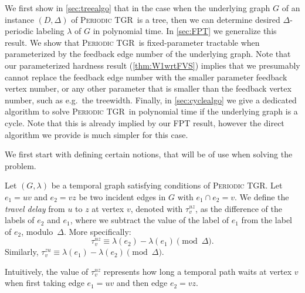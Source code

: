 \documentclass[a4paper,UKenglish,cleveref, autoref, thm-restate, anonymous]{lipics-v2021}
\newcommand{\deltaExact}{\textsc{Periodic TGR}}
\begin{document}
We first show in \cref{sec:treealgo} that in the case when the underlying graph $G$ of an instance $(D, \Delta)$ of \deltaExact\ is a tree, then we can determine desired $\Delta$-periodic labeling $\lambda$ of $G$ in polynomial time. In \cref{sec:FPT} we generalize this result. We show that \deltaExact\ is fixed-parameter tractable when parameterized by the feedback edge number of the underlying graph. Note that our parameterized hardness result (\cref{thm:W1wrtFVS}) implies that we presumably cannot replace the feedback edge number with the smaller parameter feedback vertex number, or any other parameter that is smaller than the feedback vertex number, such as e.g.\ the treewidth.
Finally, in \cref{sec:cyclealgo} we give a dedicated algorithm to solve \deltaExact\ in polynomial time if the underlying graph is a cycle. Note that this is already implied by our FPT result, however the direct algorithm we provide is much simpler for this case.



We first start with defining certain notions, that will be of use when solving the problem.

    \begin{definition}
    Let $(G, \lambda)$ be a temporal graph satisfying conditions of \deltaExact.
    Let $e_1=uv$ and $e_2=vz$ be two incident edges in $G$ with $e_1 \cap e_2 = v$.
    We define the \emph{travel delay} from $u$ to $z$ at vertex $v$, denoted with $\tau_v^{uz}$,
    as the difference of the labels of $e_2$ and $e_1$, where we subtract the value of the label of $e_1$ from the label of $e_2$,  modulo~$\Delta$.
    More specifically:
    \begin{equation}\label{eq:def-VertexWaitingTime}
       \tau_v^{uz} \equiv \lambda (e_2) - \lambda(e_1) \pmod \Delta.
    \end{equation}
    Similarly, $\tau_v^{zu} \equiv \lambda (e_1) - \lambda(e_2) \pmod \Delta$.
    \end{definition}
    Intuitively, the value of $\tau_v^{uz}$ represents how long a temporal path waits at vertex $v$ when first taking edge $e_1=uv$ and then edge $e_2 = vz$.
\end{document}
